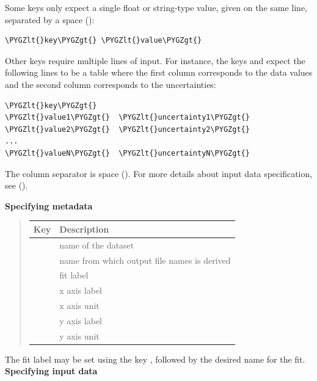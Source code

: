 \documentclass[a4paper,10pt,english]{sphinxmanual}
\def\PYGZlt{\char`\<}
\def\PYGZgt{\char`\>}
\begin{document}
\begin{fulllineitems}
Some keys only expect a single float or string-type value, given
on the same line, separated by a space ():

\begin{Verbatim}[commandchars=\\\{\}]
\PYGZlt{}key\PYGZgt{} \PYGZlt{}value\PYGZgt{}
\end{Verbatim}

Other keys require multiple lines of input. For instance, the keys
 and  expect the following lines to be a table where
the first column corresponds to the data values and the second column
corresponds to the uncertainties:

\begin{Verbatim}[commandchars=\\\{\}]
\PYGZlt{}key\PYGZgt{}
\PYGZlt{}value1\PYGZgt{}  \PYGZlt{}uncertainty1\PYGZgt{}
\PYGZlt{}value2\PYGZgt{}  \PYGZlt{}uncertainty2\PYGZgt{}
...
\PYGZlt{}valueN\PYGZgt{}  \PYGZlt{}uncertaintyN\PYGZgt{}
\end{Verbatim}

The column separator is space (). For more details about input
data specification, see {\hyperref[module_doc:specifying-input-data]{\emph{}}} ().

\textbf{Specifying metadata}
\begin{quote}

\begin{tabulary}{\linewidth}{|l|l|}
\hline
\textsf{\relax 
\textbf{Key}
} & \textsf{\relax 
\textbf{Description}
}\\
\hline
{}
 & 
name of the dataset
\\
\hline
{}
 & 
name from which output
file names is derived
\\
\hline
{}
 & 
fit label
\\
\hline
{}
 & 
x axis label
\\
\hline
{}
 & 
x axis unit
\\
\hline
{}
 & 
y axis label
\\
\hline
{}
 & 
y axis unit
\\
\hline\end{tabulary}

\end{quote}

The fit label may be set using the key , followed by the
desired name for the fit.
\label{module_doc:specifying-input-data}
\textbf{Specifying input data}


\end{fulllineitems}
\end{document}
